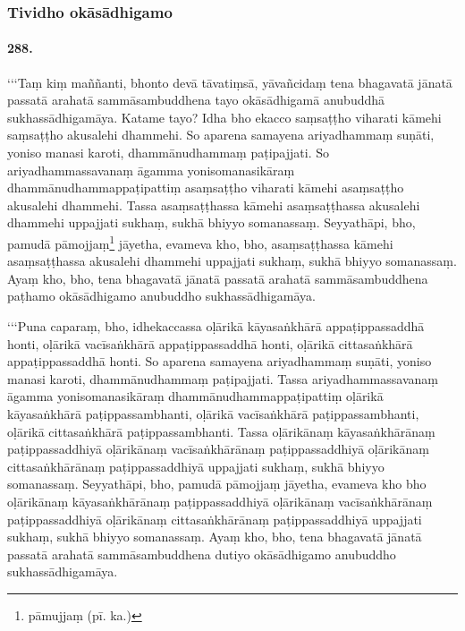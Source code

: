\subsubsection{Tividho okāsādhigamo}

\paragraph{288.} ‘‘‘Taṃ kiṃ maññanti, bhonto devā tāvatiṃsā, yāvañcidaṃ tena bhagavatā jānatā passatā arahatā sammāsambuddhena tayo okāsādhigamā anubuddhā sukhassādhigamāya. Katame tayo? Idha bho ekacco saṃsaṭṭho viharati kāmehi saṃsaṭṭho akusalehi dhammehi. So aparena samayena ariyadhammaṃ suṇāti, yoniso manasi karoti, dhammānudhammaṃ paṭipajjati. So ariyadhammassavanaṃ āgamma yonisomanasikāraṃ dhammānudhammappaṭipattiṃ asaṃsaṭṭho viharati kāmehi asaṃsaṭṭho akusalehi dhammehi. Tassa asaṃsaṭṭhassa kāmehi asaṃsaṭṭhassa akusalehi dhammehi uppajjati sukhaṃ, sukhā bhiyyo somanassaṃ. Seyyathāpi, bho, pamudā pāmojjaṃ\footnote{pāmujjaṃ (pī. ka.)} jāyetha, evameva kho, bho, asaṃsaṭṭhassa kāmehi asaṃsaṭṭhassa akusalehi dhammehi uppajjati sukhaṃ, sukhā bhiyyo somanassaṃ. Ayaṃ kho, bho, tena bhagavatā jānatā passatā arahatā sammāsambuddhena paṭhamo okāsādhigamo anubuddho sukhassādhigamāya.

‘‘‘Puna caparaṃ, bho, idhekaccassa oḷārikā kāyasaṅkhārā appaṭippassaddhā honti, oḷārikā vacīsaṅkhārā appaṭippassaddhā honti, oḷārikā cittasaṅkhārā appaṭippassaddhā honti. So aparena samayena ariyadhammaṃ suṇāti, yoniso manasi karoti, dhammānudhammaṃ paṭipajjati. Tassa ariyadhammassavanaṃ āgamma yonisomanasikāraṃ dhammānudhammappaṭipattiṃ oḷārikā kāyasaṅkhārā paṭippassambhanti, oḷārikā vacīsaṅkhārā paṭippassambhanti, oḷārikā cittasaṅkhārā paṭippassambhanti. Tassa oḷārikānaṃ kāyasaṅkhārānaṃ paṭippassaddhiyā oḷārikānaṃ vacīsaṅkhārānaṃ paṭippassaddhiyā oḷārikānaṃ cittasaṅkhārānaṃ paṭippassaddhiyā uppajjati sukhaṃ, sukhā bhiyyo somanassaṃ. Seyyathāpi, bho, pamudā pāmojjaṃ jāyetha, evameva kho bho oḷārikānaṃ kāyasaṅkhārānaṃ paṭippassaddhiyā oḷārikānaṃ vacīsaṅkhārānaṃ paṭippassaddhiyā oḷārikānaṃ cittasaṅkhārānaṃ paṭippassaddhiyā uppajjati sukhaṃ, sukhā bhiyyo somanassaṃ. Ayaṃ kho, bho, tena bhagavatā jānatā passatā arahatā sammāsambuddhena dutiyo okāsādhigamo anubuddho sukhassādhigamāya.

